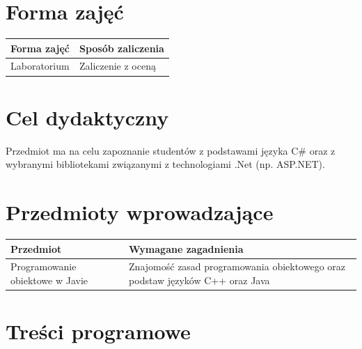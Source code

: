 \documentclass[12pt, a4paper]{article}
\begin{document}
\section{Forma zajęć}

\begin{tabular}{ll}
  \hline
  \textbf{Forma zajęć} & \textbf{Sposób zaliczenia} \\
  \hline
  Laboratorium & Zaliczenie z oceną \\
  \hline
\end{tabular}

\section{Cel dydaktyczny}

Przedmiot ma na celu zapoznanie studentów z podstawami języka C\# oraz z wybranymi bibliotekami związanymi z technologiami .Net (np. ASP.NET).

\section{Przedmioty wprowadzające}

\begin{tabularx}{\textwidth}{lX}
  \hline
  \textbf{Przedmiot} & \textbf{Wymagane zagadnienia} \\
  \hline
  Programowanie obiektowe w Javie & Znajomość zasad programowania obiektowego oraz podstaw języków C++ oraz Java \\
  \hline
\end{tabularx}

\section{Treści programowe}
\end{document}
